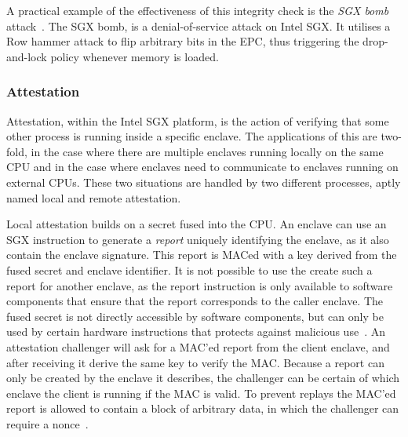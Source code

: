 \documentclass{article}
\begin{document}
			A practical example of the effectiveness of this integrity check is the \textit{SGX bomb} attack~\cite{jang_sgx-bomb_2017}.
			The SGX bomb, is a denial-of-service attack on Intel SGX.
			It utilises a Row hammer attack to flip arbitrary bits in the EPC, thus triggering the drop-and-lock policy whenever memory is loaded.

			\subsubsection{Attestation}
			\label{subsec:attestation}

			Attestation, within the Intel SGX platform, is the action of verifying that some other process is running inside a specific enclave.
			The applications of this are two-fold, in the case where there are multiple enclaves running locally on the same CPU and in the case where enclaves need to communicate to enclaves running on external CPUs.
			These two situations are handled by two different processes, aptly named local and remote attestation.

			Local attestation builds on a secret fused into the CPU.
			An enclave can use an SGX instruction to generate a \textit{report} uniquely identifying the enclave, as it also contain the enclave signature.
			This report is MACed with a key derived from the fused secret and enclave identifier.
			It is not possible to use the create such a report for another enclave, as the report instruction is only available to software components that ensure that the report corresponds to the caller enclave.
			The fused secret is not directly accessible by software components, but can only be used by certain hardware instructions that protects against malicious use~\cite{costan_intel_2016}.
			An attestation challenger will ask for a MAC'ed report from the client enclave, and after receiving it derive the same key to verify the MAC.
			Because a report can only be created by the enclave it describes, the challenger can be certain of which enclave the client is running if the MAC is valid.
			To prevent replays the MAC'ed report is allowed to contain a block of arbitrary data, in which the challenger can require a nonce~\cite{costan_intel_2016}.
\end{document}

